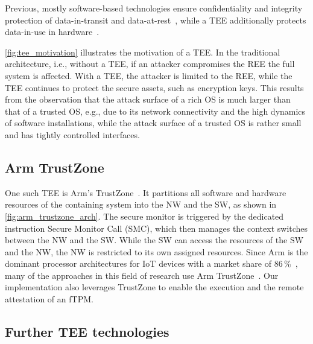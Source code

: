 
Previous, mostly software-based technologies ensure confidentiality and integrity protection of data-in-transit and data-at-rest~\cite{Pecholt2022}, while a \ac{TEE} additionally protects data-in-use in hardware~\cite{Pecholt2022, Lee:EECS-2022-96}.


\autoref{fig:tee_motivation} illustrates the motivation of a \ac{TEE}\@.
In the traditional architecture, i.e., without a TEE, if an attacker compromises the \ac{REE} the full system is affected.
With a \ac{TEE}, the attacker is limited to the \ac{REE}, while the \ac{TEE} continues to protect the secure assets, such as encryption keys.
This results from the observation that the attack surface of a rich OS is much larger than that of a trusted OS, e.g., due to its network connectivity and the high dynamics of software installations, while the attack surface of a trusted OS is rather small and has tightly controlled interfaces.



\subsection{Arm TrustZone}

One such \ac{TEE} is Arm's TrustZone~\cite{ARM09, Ngabonziza2016}. It partitions all software and hardware resources of the containing system into the \ac{NW} and the \ac{SW}, as shown in \autoref{fig:arm_trustzone_arch}. The secure monitor is triggered by the dedicated instruction Secure Monitor Call (SMC), which then manages the context switches between the \ac{NW} and the \ac{SW}.
While the \ac{SW} can access the resources of the \ac{SW} and the \ac{NW}, the \ac{NW} is restricted to its own assigned resources.
Since Arm is the dominant processor architectures for IoT devices with a market share of 86\,\%~\cite{eclipse}, many of the approaches in this field of research use Arm TrustZone~\cite{Valadares2021}.
Our implementation also leverages TrustZone to enable the execution and the remote attestation of an fTPM\@.



\subsection{Further TEE technologies}

